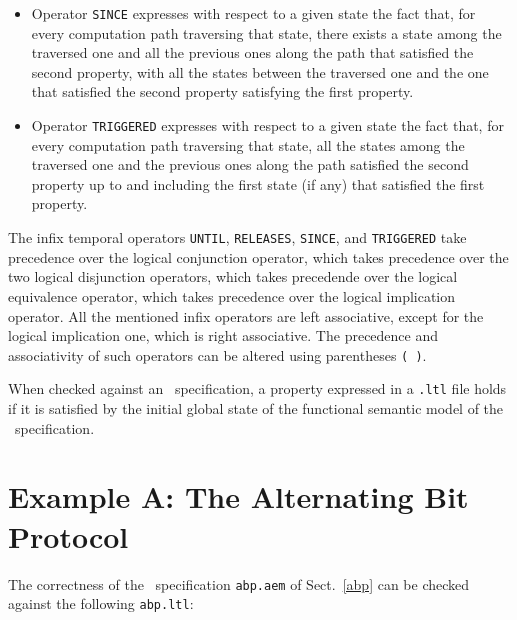 \begin{itemize}
\item Operator {\tt SINCE} expresses with respect to a given state the fact that, for every computation path
traversing that state, there exists a state among the traversed one and all the previous ones along the path
that satisfied the second property, with all the states between the traversed one and the one that satisfied
the second property satisfying the first property.

\item Operator {\tt TRIGGERED} expresses with respect to a given state the fact that, for every computation
path traversing that state, all the states among the traversed one and the previous ones along the path
satisfied the second property up to and including the first state (if any) that satisfied the first
property.

	\end{itemize}

The infix temporal operators {\tt UNTIL}, {\tt RELEASES}, {\tt SINCE}, and {\tt TRIGGERED} take precedence
over the logical conjunction operator, which takes precedence over the two logical disjunction operators,
which takes precedende over the logical equivalence operator, which takes precedence over the logical
implication operator. All the mentioned infix operators are left associative, except for the logical
implication one, which is right associative. The precedence and associativity of such operators can be
altered using parentheses {\tt ( )}.

When checked against an \aemilia\ specification, a property expressed in a {\tt .ltl} file holds if it is
satisfied by the initial global state of the functional semantic model of the \aemilia\ specification.



\section{Example A: The Alternating Bit Protocol}

The correctness of the \aemilia\ specification {\tt abp.aem} of Sect.~\ref{abp} can be checked against the
following {\tt abp.ltl}:

